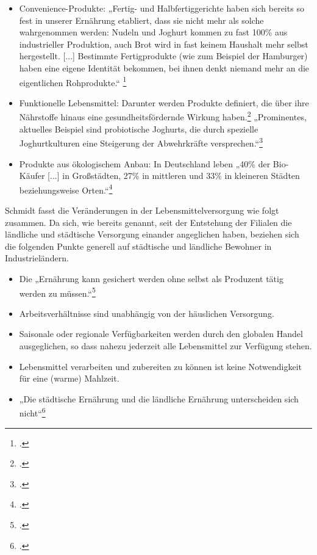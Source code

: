 \documentclass{scrartcl}
\begin{document}
 \begin{itemize}
\item Convenience-Produkte: „Fertig- und Halbfertiggerichte haben sich bereits so fest in unserer Ernährung etabliert, dass sie nicht mehr als solche wahrgenommen werden: Nudeln und Joghurt kommen zu fast 100\% aus industrieller Produktion, auch Brot wird in fast keinem Haushalt mehr selbst hergestellt. [...] Bestimmte Fertigprodukte (wie zum Beispiel der Hamburger)
haben eine eigene Identität bekommen, bei ihnen denkt niemand mehr an die eigentlichen Rohprodukte.“ \footcite{Escher2003EssenKultur}
\item Funktionelle Lebensmittel: Darunter werden Produkte definiert, die über ihre Nährstoffe hinaus eine gesundheitsfördernde Wirkung haben.\footcites[Vgl.][S.5]{Heasman1958-2001TheProfits} „Prominentes, aktuelles Beispiel sind probiotische Joghurts, die durch spezielle Joghurtkulturen eine Steigerung der Abwehrkräfte versprechen.“\footcite[S.14]{Stierand2008StadtLebensmittel}
\item Produkte aus ökologischem Anbau: In Deutschland leben „40\% der Bio-Käufer [...] in Großstädten, 27\% in mittleren und 33\% in kleineren Städten beziehungsweise Orten.“\footcite[S.14]{Stierand2008StadtLebensmittel}
\end{itemize}
Schmidt fasst die Veränderungen in der Lebensmittelversorgung wie folgt zusammen. Da sich, wie bereits genannt, seit der Entstehung der Filialen die ländliche und städtische Versorgung einander angeglichen haben, beziehen sich die folgenden Punkte generell auf städtische und ländliche Bewohner in Industrieländern.

\begin{itemize}
\item Die „Ernährung kann gesichert werden ohne selbst als Produzent tätig werden zu
müssen.“\footcite[S.20]{SchmidtDieVon}
\item Arbeitsverhältnisse sind unabhängig von der häuslichen Versorgung.
\item Saisonale oder regionale Verfügbarkeiten werden durch den globalen Handel
ausgeglichen, so dass nahezu jederzeit alle Lebensmittel zur Verfügung stehen.
\item Lebensmittel verarbeiten und zubereiten zu können ist keine Notwendigkeit für
eine (warme) Mahlzeit.
\item „Die städtische Ernährung und die ländliche Ernährung unterscheiden sich nicht“\footcite[S.20]{SchmidtDieVon}
\end{itemize}
\end{document}
